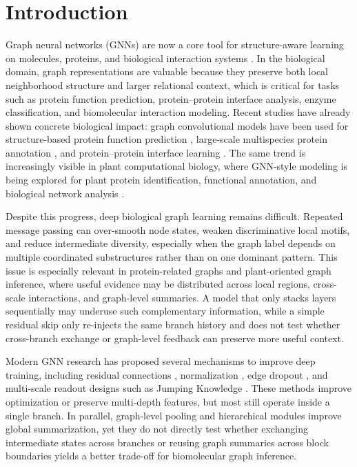 \section{Introduction}

Graph neural networks (GNNs) are now a core tool for structure-aware learning on molecules, proteins, and biological interaction systems \cite{kipf2016semi,gilmer2017neural,hamilton2017inductive}. In the biological domain, graph representations are valuable because they preserve both local neighborhood structure and larger relational context, which is critical for tasks such as protein function prediction, protein--protein interface analysis, enzyme classification, and biomolecular interaction modeling. Recent studies have already shown concrete biological impact: graph convolutional models have been used for structure-based protein function prediction \cite{gligorijevic2021structure}, large-scale multispecies protein annotation \cite{you2021deepgraphgo}, and protein--protein interface learning \cite{reau2022deeprankgnn}. The same trend is increasingly visible in plant computational biology, where GNN-style modeling is being explored for plant protein identification, functional annotation, and biological network analysis \cite{suiIdentificationPlantVacuole2023,charulekhaUncoveringComplicatedPlant,baongoImprovingPlantFunctional2025}. 

Despite this progress, deep biological graph learning remains difficult. Repeated message passing can over-smooth node states, weaken discriminative local motifs, and reduce intermediate diversity, especially when the graph label depends on multiple coordinated substructures rather than on one dominant pattern. This issue is especially relevant in protein-related graphs and plant-oriented graph inference, where useful evidence may be distributed across local regions, cross-scale interactions, and graph-level summaries. A model that only stacks layers sequentially may underuse such complementary information, while a simple residual skip only re-injects the same branch history and does not test whether cross-branch exchange or graph-level feedback can preserve more useful context.

Modern GNN research has proposed several mechanisms to improve deep training, including residual connections \cite{he2016deep, bresson2017residual}, normalization \cite{zhao2020pair, cai2021graphnorm}, edge dropout \cite{rong2019dropedge}, and multi-scale readout designs such as Jumping Knowledge \cite{xu2018representation}. These methods improve optimization or preserve multi-depth features, but most still operate inside a single branch. In parallel, graph-level pooling and hierarchical modules improve global summarization, yet they do not directly test whether exchanging intermediate states across branches or reusing graph summaries across block boundaries yields a better trade-off for biomolecular graph inference.

